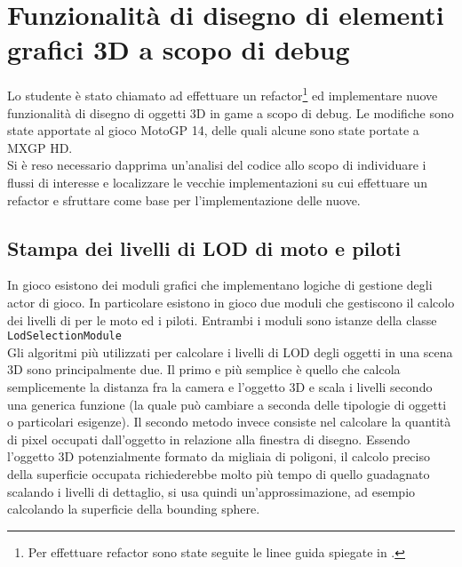 
\chapter{Funzionalità di disegno di elementi grafici 3D a scopo di debug}
\label{cap:game}

Lo studente è stato chiamato ad effettuare un refactor\footnote{Per effettuare refactor sono state seguite le linee guida spiegate in .} ed implementare nuove funzionalità di disegno di oggetti 3D in game a scopo di debug. Le modifiche sono state apportate al gioco MotoGP 14, delle quali alcune sono state portate a MXGP HD.\\

Si è reso necessario dapprima un'analisi del codice allo scopo di individuare i flussi di interesse e localizzare le vecchie implementazioni su cui effettuare un refactor e sfruttare come base per l'implementazione delle nuove.\\

\section{Stampa dei livelli di LOD di moto e piloti}

In gioco esistono dei moduli grafici che implementano logiche di gestione degli actor di gioco. In particolare esistono in gioco due moduli che gestiscono il calcolo dei livelli di  per le moto ed i piloti. Entrambi i moduli sono istanze della classe \texttt{LodSelectionModule}\\

Gli algoritmi più utilizzati per calcolare i livelli di LOD degli oggetti in una scena 3D sono principalmente due. Il primo e più semplice è quello che calcola semplicemente la distanza fra la camera e l'oggetto 3D e scala i livelli secondo una generica funzione (la quale può cambiare a seconda delle tipologie di oggetti o particolari esigenze). Il secondo metodo invece consiste nel calcolare la quantità di pixel occupati dall'oggetto in relazione alla finestra di disegno. Essendo l'oggetto 3D potenzialmente formato da migliaia di poligoni, il calcolo preciso della superficie occupata richiederebbe molto più tempo di quello guadagnato scalando i livelli di dettaglio, si usa quindi un'approssimazione, ad esempio calcolando la superficie della bounding sphere.\\

